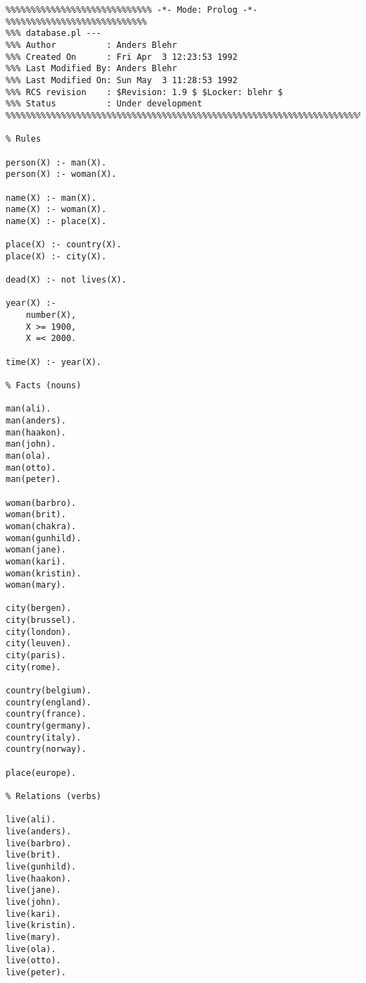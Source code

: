 \begin{verbatim}
%%%%%%%%%%%%%%%%%%%%%%%%%%%%% -*- Mode: Prolog -*- %%%%%%%%%%%%%%%%%%%%%%%%%%%%
%%% database.pl --- 
%%% Author          : Anders Blehr
%%% Created On      : Fri Apr  3 12:23:53 1992
%%% Last Modified By: Anders Blehr
%%% Last Modified On: Sun May  3 11:28:53 1992
%%% RCS revision    : $Revision: 1.9 $ $Locker: blehr $
%%% Status          : Under development
%%%%%%%%%%%%%%%%%%%%%%%%%%%%%%%%%%%%%%%%%%%%%%%%%%%%%%%%%%%%%%%%%%%%%%%%%%%%%%

% Rules

person(X) :- man(X).
person(X) :- woman(X).

name(X) :- man(X).
name(X) :- woman(X).
name(X) :- place(X).

place(X) :- country(X).
place(X) :- city(X).

dead(X) :- not lives(X).

year(X) :-
	number(X),
	X >= 1900,
	X =< 2000.

time(X) :- year(X).

% Facts (nouns)

man(ali).
man(anders).
man(haakon).
man(john).
man(ola).
man(otto).
man(peter).

woman(barbro).
woman(brit).
woman(chakra).
woman(gunhild).
woman(jane).
woman(kari).
woman(kristin).
woman(mary).

city(bergen).
city(brussel).
city(london).
city(leuven).
city(paris).
city(rome).

country(belgium).
country(england).
country(france).
country(germany).
country(italy).
country(norway).

place(europe).

% Relations (verbs)

live(ali).
live(anders).
live(barbro).
live(brit).
live(gunhild).
live(haakon).
live(jane).
live(john).
live(kari).
live(kristin).
live(mary).
live(ola).
live(otto).
live(peter).
\end{verbatim}
